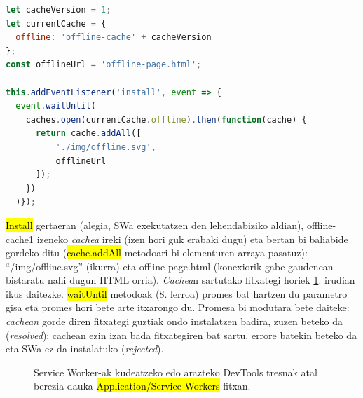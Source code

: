 \begin{lstlisting}[language=JavaScript]
let cacheVersion = 1;
let currentCache = {
  offline: 'offline-cache' + cacheVersion
};
const offlineUrl = 'offline-page.html';

this.addEventListener('install', event => {
  event.waitUntil(
    caches.open(currentCache.offline).then(function(cache) {
      return cache.addAll([
          './img/offline.svg',
          offlineUrl
      ]);
    })
  )});
\end{lstlisting}

\hl{Install} gertaeran (alegia, SWa exekutatzen den lehendabiziko aldian), \textquotesingle{}offline-cache1\textquotesingle{} izeneko \textit{cachea} ireki (izen hori guk erabaki dugu) eta bertan bi baliabide gordeko ditu (\hl{cache.addAll} metodoari bi elementuren arraya pasatuz): ``/img/offline.svg'' (ikurra) eta offline-page.html (konexiorik gabe gaudenean bistaratu nahi dugun HTML orria). \textit{Cachea}n sartutako fitxategi horiek \ref{fig:serviceworker5}. irudian ikus daitezke. \hl{waitUntil} metodoak (8. lerroa) promes bat hartzen du parametro gisa eta promes hori bete arte itxarongo du. Promesa bi modutara bete daiteke: \textit{cachean} gorde diren fitxategi guztiak ondo instalatzen badira, zuzen beteko da (\textit{resolved}); cachean ezin izan bada fitxategiren bat sartu, errore batekin beteko da eta SWa ez da instalatuko (\textit{rejected}).

\begin{figure}[ht]
	\centering
{}
\caption{Service Worker-ak kudeatzeko edo arazteko DevTools tresnak atal berezia dauka \hl{Application/Service Workers} fitxan.}
\label{fig:serviceworker5}
\end{figure}


